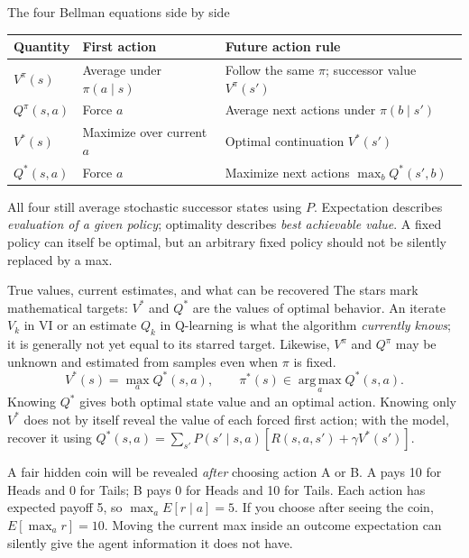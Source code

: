 \documentclass[10pt,a4paper]{article}
\newcommand{\argmax}{\operatorname*{arg\,max}}
\begin{document}
\begin{card}{The four Bellman equations side by side}
\small
\begin{tabularx}{\linewidth}{@{}P{1.8cm}Y Y@{}}
\toprule Quantity & First action & Future action rule \\\midrule
$V^\pi(s)$ & Average under $\pi(a\mid s)$ & Follow the same $\pi$; successor value $V^\pi(s')$ \\
$Q^\pi(s,a)$ & Force $a$ & Average next actions under $\pi(b\mid s')$ \\
$V^*(s)$ & Maximize over current $a$ & Optimal continuation $V^*(s')$ \\
$Q^*(s,a)$ & Force $a$ & Maximize next actions $\max_bQ^*(s',b)$ \\\bottomrule
\end{tabularx}
\normalsize
All four still average stochastic successor states using $P$. Expectation describes \emph{evaluation of a given policy}; optimality describes \emph{best achievable value}. A fixed policy can itself be optimal, but an arbitrary fixed policy should not be silently replaced by a max.
\end{card}

\begin{card}{True values, current estimates, and what can be recovered}
The stars mark mathematical targets: $V^*$ and $Q^*$ are the values of optimal behavior. An iterate $V_k$ in VI or an estimate $Q_k$ in Q-learning is what the algorithm \emph{currently knows}; it is generally not yet equal to its starred target. Likewise, $V^\pi$ and $Q^\pi$ may be unknown and estimated from samples even when $\pi$ is fixed.
\[
V^*(s)=\max_aQ^*(s,a),\qquad
\pi^*(s)\in\argmax_aQ^*(s,a).
\]
Knowing $Q^*$ gives both optimal state value and an optimal action. Knowing only $V^*$ does not by itself reveal the value of each forced first action; with the model, recover it using $Q^*(s,a)=\sum_{s'}P(s'\mid s,a)[R(s,a,s')+\gamma V^*(s')]$.
\end{card}

\begin{idea}
A fair hidden coin will be revealed \emph{after} choosing action A or B. A pays 10 for Heads and 0 for Tails; B pays 0 for Heads and 10 for Tails. Each action has expected payoff 5, so $\max_aE[r\mid a]=5$. If you choose after seeing the coin, $E[\max_a r]=10$. Moving the current max inside an outcome expectation can silently give the agent information it does not have.
\end{idea}
\end{document}
